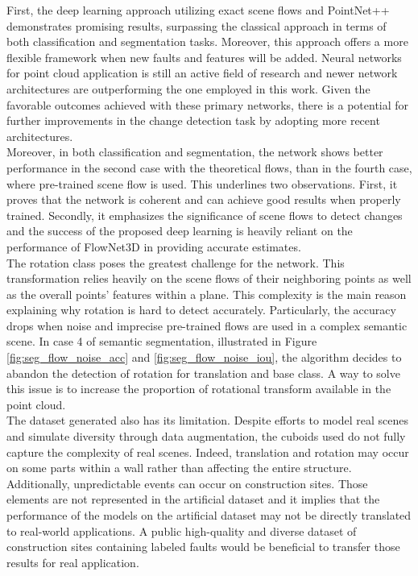 First, the deep learning approach utilizing exact scene flows and PointNet++ demonstrates promising results, surpassing the classical approach in terms of both classification and segmentation tasks. Moreover, this approach offers a more flexible framework when new faults and features will be added. Neural networks for point cloud application is still an active field of research and newer network architectures are outperforming the one employed in this work. Given the favorable outcomes achieved with these primary networks, there is a potential for further improvements in the change detection task by adopting more recent architectures.\\  

Moreover, in both classification and segmentation, the network shows better performance in the second case with the theoretical flows, than in the fourth case, where pre-trained scene flow is used. This underlines two observations. First, it proves that the network is coherent and can achieve good results when properly trained. Secondly, it emphasizes the significance of scene flows to detect changes and the success of the proposed deep learning is heavily reliant on the performance of FlowNet3D in providing accurate estimates.\\

The rotation class poses the greatest challenge for the network. This transformation relies heavily on the scene flows of their neighboring points as well as the overall points' features within a plane. This complexity is the main reason explaining why rotation is hard to detect accurately. Particularly, the accuracy drops when noise and imprecise pre-trained flows are used in a complex semantic scene. In case 4 of semantic segmentation, illustrated in Figure \ref{fig:seg_flow_noise_acc} and \ref{fig:seg_flow_noise_iou}, the algorithm decides to abandon the detection of rotation for translation and base class. A way to solve this issue is to increase the proportion of rotational transform available in the point cloud.\\

The dataset generated also has its limitation. Despite efforts to model real scenes and simulate diversity through data augmentation, the cuboids used do not fully capture the complexity of real scenes. Indeed, translation and rotation may occur on some parts within a wall rather than affecting the entire structure. Additionally, unpredictable events can occur on construction sites. Those elements are not represented in the artificial dataset and it implies that the performance of the models on the artificial dataset may not be directly translated to real-world applications. A public high-quality and diverse dataset of construction sites containing labeled faults would be beneficial to transfer those results for real application.\\   

